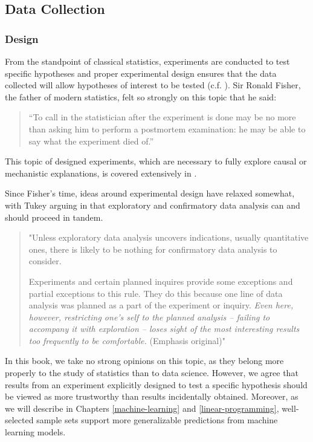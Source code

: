 \documentclass[
]{book}
\begin{document}
\hypertarget{data-collection2}{%
\subsection{Data Collection}\label{data-collection2}}

\hypertarget{design}{%
\subsubsection{Design}\label{design}}

From the standpoint of classical statistics, experiments are conducted to test specific hypotheses and proper experimental design ensures that the data collected will allow hypotheses of interest to be tested (c.f. \citet{Fisher1935}). Sir Ronald Fisher, the father of modern statistics, felt so strongly on this topic that he said:

\begin{quote}
``To call in the statistician after the experiment is done may be no more than asking him to perform a postmortem examination: he may be able to say what the experiment died of.''
\end{quote}

This topic of designed experiments, which are necessary to fully explore causal or mechanistic explanations, is covered extensively in \citet{Lawson2014}.

Since Fisher's time, ideas around experimental design have relaxed somewhat, with Tukey arguing in \citet{Tukey1977} that exploratory and confirmatory data analysis can and should proceed in tandem.

\begin{quote}
"Unless exploratory data analysis uncovers indications, usually quantitative ones, there is likely to be nothing for confirmatory data analysis to consider.

Experiments and certain planned inquires provide some exceptions and partial exceptions to this rule. They do this because one line of data analysis was planned as a part of the experiment or inquiry. \emph{Even here, however, restricting one's self to the planned analysis -- failing to accompany it with exploration -- loses sight of the most interesting results too frequently to be comfortable.} (Emphasis original)"
\end{quote}

In this book, we take no strong opinions on this topic, as they belong more properly to the study of statistics than to data science. However, we agree that results from an experiment explicitly designed to test a specific hypothesis should be viewed as more trustworthy than results incidentally obtained. Moreover, as we will describe in Chapters \ref{machine-learning} and \ref{linear-programming}, well-selected sample sets support more generalizable predictions from machine learning models.
\end{document}
